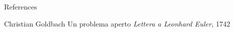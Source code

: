 
\appendix
\begin{frame}[allowframebreaks]{References}
\begin{thebibliography}{9}
	 Christian Goldbach
	\newblock Un problema aperto
	\newblock \emph{Lettera a Leonhard Euler}, 1742
\end{thebibliography}
\end{frame}
